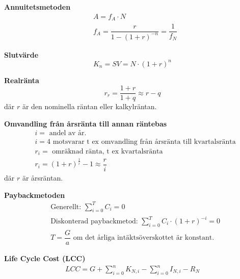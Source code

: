 \textbf{Annuitetsmetoden}
\begin{align*}
  & A = f_A \cdot N \\
  & f_A = \dfrac{r}{1-(1+r)^{-n}} = \dfrac{1}{f_N}
\end{align*}

\textbf{Slutvärde}
\begin{equation*}
 K_n= SV =N \cdot (1 + r)^n
\end{equation*}

\textbf{Realränta}
\begin{equation*}
  r_r = \dfrac{1+r}{1+q} \approx r - q 
\end{equation*}
där $r$ är den nominella räntan eller kalkylräntan.

\textbf{Omvandling från årsränta till annan räntebas}
\begin{align*}
  & i = \text{ andel av år.} \\
  & i = 4 \text{ motsvarar t ex omvandling från årsränta till kvartalsränta}\\
  & r_i = \text{ omräknad ränta, t ex kvartalsränta}\\
  & r_i = (1+r)^{\tfrac{1}{i}} - 1 \approx \dfrac{r}{i} 
\end{align*}
där $r$ är årsräntan.

\textbf{Paybackmetoden}
\begin{align*}
  & \text{Generellt: }\sum_{i=0}^{T} C_i = 0 \\
  & \text{Diskonterad paybackmetod: }\sum_{i=0}^{T} C_i \cdot (1+r)^{-i} = 0 \\
  &  T = \dfrac{G}{a} \text{ om det årliga intäktsöverskottet är konstant. } 
\end{align*}

\textbf{Life Cycle Cost (LCC)}
\begin{align*}
  LCC = G + \sum_{i=0}^{n} K_{N,i} - \sum_{i=0}^{n} I_{N,i} - R_N
\end{align*}
